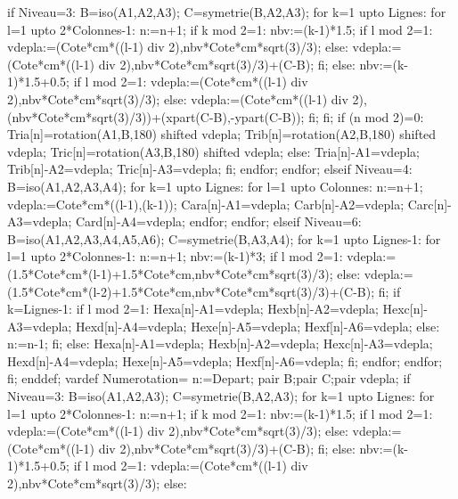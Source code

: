 {  if Niveau=3:
    B=iso(A1,A2,A3);
    C=symetrie(B,A2,A3);
    for k=1 upto Lignes:
      for l=1 upto 2*Colonnes-1:
        n:=n+1;
        if k mod 2=1:
        nbv:=(k-1)*1.5;
          if l mod 2=1:
          vdepla:=(Cote*cm*((l-1) div 2),nbv*Cote*cm*sqrt(3)/3);
          else:
          vdepla:=(Cote*cm*((l-1) div 2),nbv*Cote*cm*sqrt(3)/3)+(C-B);
          fi;
          else:
          nbv:=(k-1)*1.5+0.5;
        if l mod 2=1:
        vdepla:=(Cote*cm*((l-1) div 2),nbv*Cote*cm*sqrt(3)/3);
        else:
        vdepla:=(Cote*cm*((l-1) div 2),(nbv*Cote*cm*sqrt(3)/3))+(xpart(C-B),-ypart(C-B));
        fi;
        fi;
        if (n mod 2)=0:
        Tria[n]=rotation(A1,B,180) shifted vdepla;
        Trib[n]=rotation(A2,B,180) shifted vdepla;
        Tric[n]=rotation(A3,B,180) shifted vdepla;
        else:
        Tria[n]-A1=vdepla;
        Trib[n]-A2=vdepla;
        Tric[n]-A3=vdepla;
        fi;
  endfor;
  endfor;
  elseif Niveau=4:
  B=iso(A1,A2,A3,A4);
  for k=1 upto Lignes:
  for l=1 upto Colonnes:
  n:=n+1;
  vdepla:=Cote*cm*((l-1),(k-1));
  Cara[n]-A1=vdepla;
  Carb[n]-A2=vdepla;
  Carc[n]-A3=vdepla;
  Card[n]-A4=vdepla;
  endfor;
  endfor;
  elseif Niveau=6:
  B=iso(A1,A2,A3,A4,A5,A6);
  C=symetrie(B,A3,A4);
    for k=1 upto Lignes-1:
      for l=1 upto 2*Colonnes-1:
        n:=n+1;
        nbv:=(k-1)*3;
        if l mod 2=1:
          vdepla:=(1.5*Cote*cm*(l-1)+1.5*Cote*cm,nbv*Cote*cm*sqrt(3)/3);
        else:
          vdepla:=(1.5*Cote*cm*(l-2)+1.5*Cote*cm,nbv*Cote*cm*sqrt(3)/3)+(C-B);
        fi;
        if k=Lignes-1:
        if l mod 2=1:
        Hexa[n]-A1=vdepla;
        Hexb[n]-A2=vdepla;
        Hexc[n]-A3=vdepla;
        Hexd[n]-A4=vdepla;
        Hexe[n]-A5=vdepla;
        Hexf[n]-A6=vdepla;
        else:
        n:=n-1;
        fi;
        else:
        Hexa[n]-A1=vdepla;
        Hexb[n]-A2=vdepla;
        Hexc[n]-A3=vdepla;
        Hexd[n]-A4=vdepla;
        Hexe[n]-A5=vdepla;
        Hexf[n]-A6=vdepla;
        fi;
      endfor;
    endfor;
  fi;
  enddef;
  vardef Numerotation=
  n:=Depart;
  pair B;pair C;pair vdepla;
  if Niveau=3:
    B=iso(A1,A2,A3);
    C=symetrie(B,A2,A3);
    for k=1 upto Lignes:
      for l=1 upto 2*Colonnes-1:
        n:=n+1;
        if k mod 2=1:
        nbv:=(k-1)*1.5;
          if l mod 2=1:
          vdepla:=(Cote*cm*((l-1) div 2),nbv*Cote*cm*sqrt(3)/3);
          else:
          vdepla:=(Cote*cm*((l-1) div 2),nbv*Cote*cm*sqrt(3)/3)+(C-B);
          fi;
          else:
          nbv:=(k-1)*1.5+0.5;
        if l mod 2=1:
        vdepla:=(Cote*cm*((l-1) div 2),nbv*Cote*cm*sqrt(3)/3);
        else:
}
